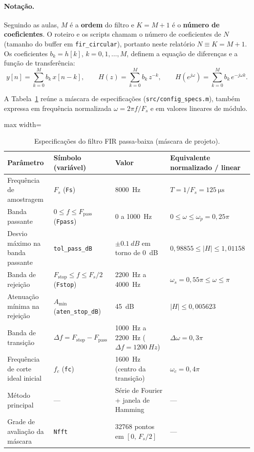 \documentclass[11pt,a4paper]{article}
\begin{document}
\paragraph{Notação.} Seguindo as aulas, $M$ é a \textbf{ordem} do filtro e $K = M + 1$ é o \textbf{número de coeficientes}. O roteiro e os scripts chamam o número de coeficientes de $N$ (tamanho do buffer em \texttt{fir\_circular}), portanto neste relatório $N \equiv K = M + 1$. Os coeficientes $b_k = h[k]$, $k = 0, 1, \dots, M$, definem a equação de diferenças e a função de transferência:
\begin{equation}
    y[n] = \sum_{k=0}^{M} b_k\, x[n-k], \qquad H(z) = \sum_{k=0}^{M} b_k\, z^{-k}, \qquad H(e^{j\omega}) = \sum_{k=0}^{M} b_k\, e^{-j\omega k}.
    \label{eq:fir}
\end{equation}

A Tabela~\ref{tab:especificacoes} reúne a máscara de especificações (\texttt{src/config\_specs.m}), também expressa em frequência normalizada $\omega = 2\pi f / F_s$ e em valores lineares de módulo.

\begin{table}[!htbp]
    \centering
    \caption{Especificações do filtro FIR passa-baixa (máscara de projeto).}
    \label{tab:especificacoes}
    \small
    \begin{adjustbox}{max width=\textwidth}
    \begin{tabular}{@{}llll@{}}
        \toprule
        \textbf{Parâmetro} & \textbf{Símbolo (variável)} & \textbf{Valor} & \textbf{Equivalente normalizado / linear} \\
        \midrule
        Frequência de amostragem & $F_s$ (\texttt{Fs}) & \SI{8000}{Hz} & $T = 1/F_s = \SI{125}{\micro\second}$ \\
        Banda passante & $0 \le f \le F_{\text{pass}}$ (\texttt{Fpass}) & 0 a \SI{1000}{Hz} & $0 \le \omega \le \omega_p = 0,25\pi$ \\
        Desvio máximo na banda passante & \texttt{tol\_pass\_dB} & $\pm\SI{0,1}{dB}$ em torno de \SI{0}{dB} & $0,98855 \le |H| \le 1,01158$ \\
        Banda de rejeição & $F_{\text{stop}} \le f \le F_s/2$ (\texttt{Fstop}) & \SI{2200}{Hz} a \SI{4000}{Hz} & $\omega_s = 0,55\pi \le \omega \le \pi$ \\
        Atenuação mínima na rejeição & $A_{\min}$ (\texttt{aten\_stop\_dB}) & \SI{45}{dB} & $|H| \le 0,005623$ \\
        Banda de transição & $\Delta f = F_{\text{stop}} - F_{\text{pass}}$ & \SI{1000}{Hz} a \SI{2200}{Hz} ($\Delta f = \SI{1200}{Hz}$) & $\Delta\omega = 0,3\pi$ \\
        Frequência de corte ideal inicial & $f_c$ (\texttt{fc}) & \SI{1600}{Hz} (centro da transição) & $\omega_c = 0,4\pi$ \\
        Método principal & --- & Série de Fourier + janela de Hamming & --- \\
        Grade de avaliação da máscara & \texttt{Nfft} & \num{32768} pontos em $[0,\, F_s/2]$ & --- \\
        \bottomrule
    \end{tabular}
    \end{adjustbox}
\end{table}
\end{document}
